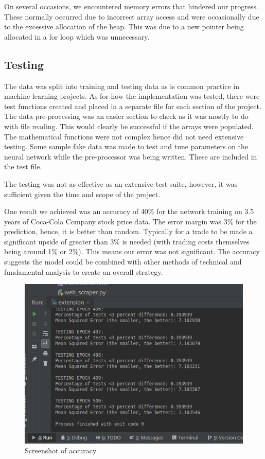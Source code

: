 \documentclass[11pt]{article}
\begin{document}
On several occasions, we encountered memory errors that hindered our progress. These normally occurred due to incorrect array access and were occasionally due to the excessive allocation of the heap. This was due to a new pointer being allocated in a for loop which was unnecessary. 

\subsection{Testing}
The data was split into training and testing data as is common practice in machine learning projects. As for how the implementation was tested, there were test functions created and placed in a separate file for each section of the project. The data pre-processing was an easier section to check as it was mostly to do with file reading. This would clearly be successful if the arrays were populated. The mathematical functions were not complex hence did not need extensive testing. Some sample fake data was made to test and tune parameters on the neural network while the pre-processor was being written. These are included in the test file. 

The testing was not as effective as an extensive test suite, however, it was sufficient given the time and scope of the project.

One result we achieved was an accuracy of 40\% for the network training on 3.5 years of Coca-Cola Company stock price data. The error margin was 3\% for the prediction, hence, it is better than random. Typically for a trade to be made a significant upside of greater than 3\% is needed (with trading costs themselves being around 1\% or 2\%). This means our error was not significant. The accuracy suggests the model could be combined with other methods of technical and fundamental analysis to create an overall strategy. 

\begin{figure}
\centering
\includegraphics[scale=0.5]{accuracy}
\caption{Screenshot of accuracy}
\end{figure}
\end{document}
